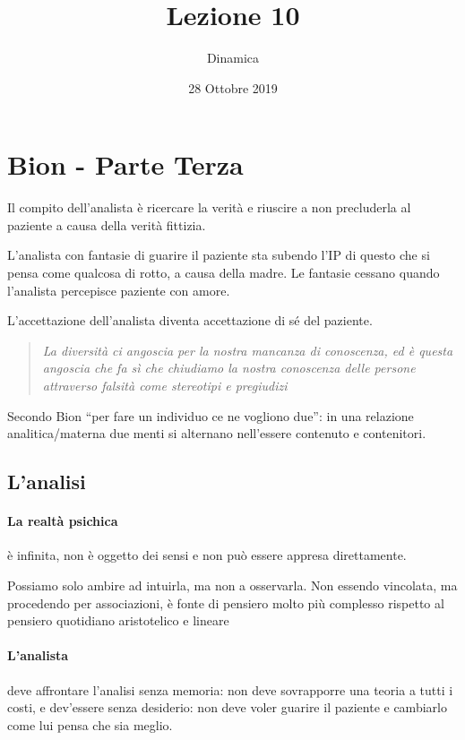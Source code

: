 \documentclass[12pt, a4paper]{article}
\date{28 Ottobre 2019}
\title{Lezione 10}
\author{Dinamica}
\begin{document}
\maketitle

\section{Bion - Parte Terza} 

Il compito dell'analista \`e ricercare la verit\`a e riuscire a non precluderla al paziente a causa della verit\`a fittizia.

L'analista con fantasie di guarire il paziente sta subendo l'IP di questo che si pensa come qualcosa di rotto, a causa della madre. Le fantasie cessano quando l'analista percepisce paziente con amore.

L'accettazione dell'analista diventa accettazione di s\'e del paziente.

\medskip
\begin{quote}\emph{La diversit\`a ci angoscia per la nostra mancanza di conoscenza, ed \`e questa angoscia che fa s\`i che chiudiamo la nostra conoscenza delle persone attraverso falsit\`a come stereotipi e pregiudizi}
\end{quote}
\medskip

Secondo Bion ``per fare un individuo ce ne vogliono due'': in una relazione analitica/materna due menti si alternano nell'essere contenuto e contenitori.

\subsection{L'analisi}

\paragraph{La realt\`a psichica} \`e infinita, non \`e oggetto dei sensi e non può essere appresa direttamente. 

Possiamo solo ambire ad intuirla, ma non a osservarla. Non essendo vincolata, ma procedendo per associazioni, \`e fonte di pensiero molto pi\`u complesso rispetto al pensiero quotidiano aristotelico e lineare

\paragraph{L'analista} deve affrontare l'analisi senza memoria: non deve sovrapporre una teoria a tutti i costi, e dev'essere senza desiderio: non deve voler guarire il paziente e cambiarlo come lui pensa che sia meglio.
\end{document}
